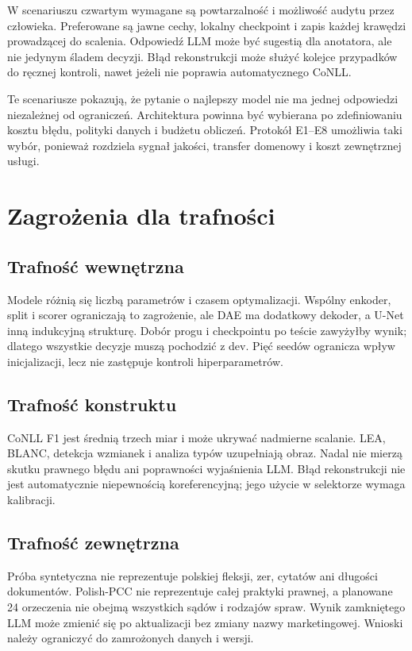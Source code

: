 W scenariuszu czwartym wymagane są powtarzalność i możliwość audytu przez człowieka. Preferowane są jawne cechy, lokalny checkpoint i zapis każdej krawędzi prowadzącej do scalenia. Odpowiedź LLM może być sugestią dla anotatora, ale nie jedynym śladem decyzji. Błąd rekonstrukcji może służyć kolejce przypadków do ręcznej kontroli, nawet jeżeli nie poprawia automatycznego CoNLL.

Te scenariusze pokazują, że pytanie o najlepszy model nie ma jednej odpowiedzi niezależnej od ograniczeń. Architektura powinna być wybierana po zdefiniowaniu kosztu błędu, polityki danych i budżetu obliczeń. Protokół E1--E8 umożliwia taki wybór, ponieważ rozdziela sygnał jakości, transfer domenowy i koszt zewnętrznej usługi.

\section{Zagrożenia dla trafności}

\subsection{Trafność wewnętrzna}

Modele różnią się liczbą parametrów i czasem optymalizacji. Wspólny enkoder, split i scorer ograniczają to zagrożenie, ale DAE ma dodatkowy dekoder, a U-Net inną indukcyjną strukturę. Dobór progu i checkpointu po teście zawyżyłby wynik; dlatego wszystkie decyzje muszą pochodzić z dev. Pięć seedów ogranicza wpływ inicjalizacji, lecz nie zastępuje kontroli hiperparametrów.

\subsection{Trafność konstruktu}

CoNLL F1 jest średnią trzech miar i może ukrywać nadmierne scalanie. LEA, BLANC, detekcja wzmianek i analiza typów uzupełniają obraz. Nadal nie mierzą skutku prawnego błędu ani poprawności wyjaśnienia LLM. Błąd rekonstrukcji nie jest automatycznie niepewnością koreferencyjną; jego użycie w selektorze wymaga kalibracji.

\subsection{Trafność zewnętrzna}

Próba syntetyczna nie reprezentuje polskiej fleksji, zer, cytatów ani długości dokumentów. Polish-PCC nie reprezentuje całej praktyki prawnej, a planowane 24 orzeczenia nie obejmą wszystkich sądów i rodzajów spraw. Wynik zamkniętego LLM może zmienić się po aktualizacji bez zmiany nazwy marketingowej. Wnioski należy ograniczyć do zamrożonych danych i wersji.

